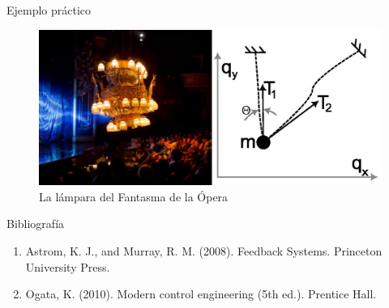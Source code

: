 \documentclass{beamer}
\begin{document}
\begin{frame}{Ejemplo práctico}
    \begin{figure}
        \centering
        \includegraphics[width=0.9\linewidth]{opera_phantom.jpg}
        \caption{La lámpara del Fantasma de la Ópera}
    \end{figure}
\end{frame}

\begin{frame}{Bibliografía}
    \begin{enumerate}
        \item Astrom, K. J., and Murray, R. M. (2008). Feedback Systems. Princeton University Press.
        \item Ogata, K. (2010). Modern control engineering (5th ed.). Prentice Hall.
    \end{enumerate}
\end{frame}
\end{document}

